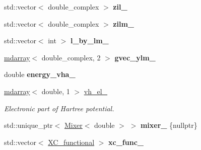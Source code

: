\begin{DoxyCompactItemize}
\item 
\hypertarget{classsirius_1_1_potential_a1010a62cf2d65377fb1a8c0020849b24}{}std\+::vector$<$ double\+\_\+complex $>$ {\bfseries zil\+\_\+}\label{classsirius_1_1_potential_a1010a62cf2d65377fb1a8c0020849b24}

\item 
\hypertarget{classsirius_1_1_potential_ab01d0a3fd83573cf6b6b34e3d1ef6ce7}{}std\+::vector$<$ double\+\_\+complex $>$ {\bfseries zilm\+\_\+}\label{classsirius_1_1_potential_ab01d0a3fd83573cf6b6b34e3d1ef6ce7}

\item 
\hypertarget{classsirius_1_1_potential_ae2a1abca8860b91354ab61c141b76a4f}{}std\+::vector$<$ int $>$ {\bfseries l\+\_\+by\+\_\+lm\+\_\+}\label{classsirius_1_1_potential_ae2a1abca8860b91354ab61c141b76a4f}

\item 
\hypertarget{classsirius_1_1_potential_ae474479d1266ed12f5196d887f9b88e1}{}\hyperlink{classsddk_1_1mdarray}{mdarray}$<$ double\+\_\+complex, 2 $>$ {\bfseries gvec\+\_\+ylm\+\_\+}\label{classsirius_1_1_potential_ae474479d1266ed12f5196d887f9b88e1}

\item 
\hypertarget{classsirius_1_1_potential_a1b3cee2d4ec5d7c841bb401729a1960a}{}double {\bfseries energy\+\_\+vha\+\_\+}\label{classsirius_1_1_potential_a1b3cee2d4ec5d7c841bb401729a1960a}

\item 
\hyperlink{classsddk_1_1mdarray}{mdarray}$<$ double, 1 $>$ \hyperlink{classsirius_1_1_potential_a0126d2afa48714b359eede273905a64c}{vh\+\_\+el\+\_\+}
\begin{DoxyCompactList}\small\item\em Electronic part of Hartree potential. \end{DoxyCompactList}\item 
\hypertarget{classsirius_1_1_potential_abd62ab6e7ac9e9995722e8caebbf0478}{}std\+::unique\+\_\+ptr$<$ \hyperlink{classsirius_1_1_mixer}{Mixer}$<$ double $>$ $>$ {\bfseries mixer\+\_\+} \{nullptr\}\label{classsirius_1_1_potential_abd62ab6e7ac9e9995722e8caebbf0478}

\item 
\hypertarget{classsirius_1_1_potential_aab013e57ad7b7e10dcb6526379b768eb}{}std\+::vector$<$ \hyperlink{classsirius_1_1_x_c__functional}{X\+C\+\_\+functional} $>$ {\bfseries xc\+\_\+func\+\_\+}\label{classsirius_1_1_potential_aab013e57ad7b7e10dcb6526379b768eb}


\end{DoxyCompactItemize}
